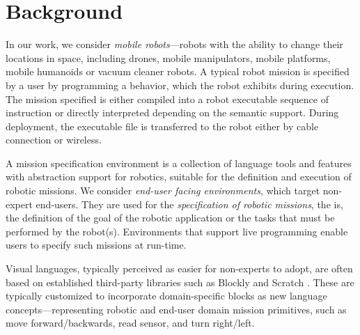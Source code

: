 \section{Background}\label{sec:background}
In our work, we consider \emph{mobile robots}---robots with the ability to change their locations in space, including drones, mobile manipulators, mobile platforms, mobile humanoids or vacuum cleaner robots. A typical robot mission is specified by a user by programming a behavior, which the robot exhibits during execution. The mission specified is either compiled into a robot executable sequence of instruction or directly interpreted depending on the semantic support. During deployment, the executable file is transferred to the robot either by cable connection or wireless.

A mission specification environment is a collection of language tools and features with abstraction support for robotics, suitable for the definition and execution of robotic missions.
We consider \emph{end-user facing environments}, which target non-expert end-users. They are used for the \emph{specification of robotic missions}, the is, the definition of the goal of the robotic application or the tasks that must be performed by the robot(s). Environments that support live programming enable users to specify such missions at run-time.

Visual languages, typically perceived as easier for non-experts to adopt, are often based on established third-party libraries such as Blockly \cite{blockly} and Scratch \cite{Kaucic2015}. These are typically customized to incorporate domain-specific blocks as new language concepts---representing robotic and end-user domain mission primitives, such as move forward/backwards, read sensor, and turn right/left.




